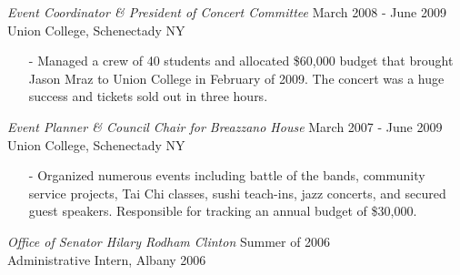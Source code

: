 \documentclass[margin, 5pt]{res} %
\begin{document}
\begin{resume}
{\sl Event Coordinator \& President of Concert Committee} \hfill March 2008 - June 2009 \\
Union College, Schenectady NY
\begin{itemize} \itemsep 0pt
\item[-] Managed a crew of 40 students and allocated \$60,000 budget that brought Jason Mraz to Union College in February of 2009. The concert was a huge success and tickets sold out in three hours.
\end{itemize}

{\sl Event Planner \& Council Chair for Breazzano House} \hfill March 2007 - June 2009 \\
Union College, Schenectady NY
\begin{itemize} \itemsep 0pt
\item[-] Organized numerous events including battle of the bands, community service projects, Tai Chi classes, sushi teach-ins, jazz concerts, and secured guest speakers.  Responsible for tracking an annual budget of \$30,000.
\end{itemize}

{\sl Office of Senator Hilary Rodham Clinton} \hfill Summer of 2006 \\
Administrative Intern, Albany 2006

\end{resume}
\end{document}
